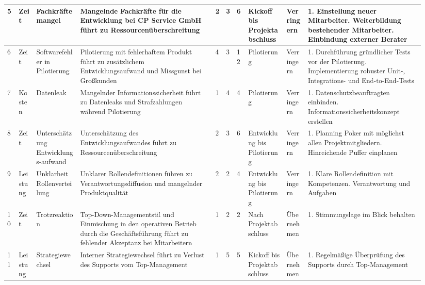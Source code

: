 \begin{landscape}
\begin{longtable}{| P{0.5cm} | P{1.7cm} | P{3cm} | P{5cm} | P{1cm} | P{1cm} | P{1cm} | P{2.2cm} | P{2cm} | P{5cm} |}
	5&Zeit&Fachkräftemangel&Mangelnde Fachkräfte für die Entwicklung bei CP Service GmbH führt zu Ressourcenüberschreitung&2&3&6&Kickoff bis Projektabschluss&Verringern&
	1. Einstellung neuer Mitarbeiter. Weiterbildung bestehender Mitarbeiter. Einbindung externer Berater\\ 
	\hline
	
	6&Zeit&Softwarefehler in Pilotierung&Pilotierung mit fehlerhaftem Produkt führt zu zusätzlichem Entwicklungsaufwand und Missgunst bei Großkunden&4&3&12&Pilotierung&Verringern&
	1. Durchführung gründlicher Tests vor der Pilotierung. Implementierung robuster Unit-, Integrations- und End-to-End-Tests\\
	\hline
	
	7&Kosten&Datenleak&Mangelnder Informationssicherheit führt zu Datenleaks und Strafzahlungen während Pilotierung&1&4&4&Pilotierung&Verringern&
	1. Datenschutzbeauftragten einbinden. Informationssicherheitskonzept erstellen\\ 
	\hline
	
	8&Zeit&Unterschätzung Entwicklungs-aufwand&Unterschätzung des Entwicklungsaufwandes führt zu Ressourcenüberschreitung&2&3&6&Entwicklung bis Pilotierung&Verringern&
	1. Planning Poker mit möglichst allen Projektmitgliedern. Hinreichende Puffer einplanen\\ 
	\hline
		
	9&Leistung&Unklarheit Rollenverteilung&Unklarer Rollendefinitionen führen zu Verantwortungsdiffusion und mangelnder Produktqualität&2&2&4&Entwicklung bis Pilotierung&Verringern&
	1. Klare Rollendefinition mit Kompetenzen. Verantwortung und Aufgaben\\ 
	\hline
	
	10&Zeit&Trotzreaktion&Top-Down-Managementstil und Einmischung in den operativen Betrieb durch die Geschäftsführung führt zu fehlender Akzeptanz bei Mitarbeitern&1&2&2&Nach Projektabschluss&Übernehmen&
	1. Stimmungslage im Blick behalten\\ 
	\hline
	
	11&Leistung&Strategiewechsel&Interner Strategiewechsel führt zu Verlust des Supports vom Top-Management&1&5&5&Kickoff bis Projektabschluss&Übernehmen&
	1. Regelmäßige Überprüfung des Supports durch Top-Management\\ 
	\hline
	

\end{longtable}
\end{landscape}
